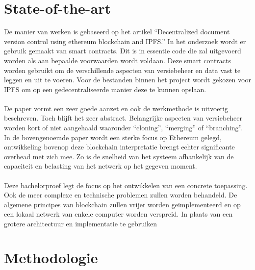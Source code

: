 
\section{State-of-the-art}
\label{sec:state-of-the-art}

De manier van werken is gebaseerd op het artikel “Decentralized document version control using ethereum blockchain and IPFS.” \autocite{Nizamuddin2019} In het onderzoek wordt er gebruik gemaakt van smart contracts. Dit is in essentie code die zal uitgevoerd worden als aan bepaalde voorwaarden wordt voldaan. Deze smart contracts worden gebruikt om de verschillende aspecten van versiebeheer en data vast te leggen en uit te voeren. Voor de bestanden binnen het project wordt gekozen voor IPFS om op een gedecentraliseerde manier deze te kunnen opslaan. \\\\
De paper vormt een zeer goede aanzet en ook de werkmethode is uitvoerig beschreven. Toch blijft het zeer abstract. Belangrijke aspecten van versiebeheer worden kort of niet aangehaald waaronder “cloning”, “merging” of “branching”. In de bovengenoemde paper wordt een sterke focus op Ethereum gelegd, ontwikkeling bovenop deze blockchain interpretatie brengt echter significante overhead met zich mee. Zo is de snelheid van het systeem afhankelijk van de capaciteit en belasting van het netwerk op het gegeven moment.\\\\
Deze bachelorproef legt de focus op het ontwikkelen van een concrete toepassing. Ook de meer complexe en technische problemen zullen worden behandeld. De algemene principes van blockchain zullen vrijer worden geïmplementeerd en op een lokaal netwerk van enkele computer worden verspreid. In plaats van een grotere architectuur en implementatie te gebruiken


\section{Methodologie}
\label{sec:methodologie}

